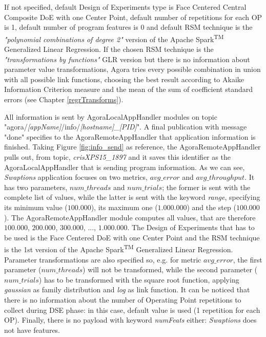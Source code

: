 If not specified, default Design of Experiments type is Face Centered Central Composite DoE with one Center Point, default number of repetitions for each OP is 1, default number of program features is 0 and default RSM technique is the \textit{"polynomial combinations of degree 2"} version of the Apache Spark\textsuperscript{TM} Generalized Linear Regression. If the chosen RSM technique is the \textit{"transformations by functions"} GLR version but there is no information about parameter value transformations, Agora tries every possible combination in union with all possible link functions, choosing the best result according to Akaike Information Criterion measure and the mean of the sum of coefficient standard errors (see Chapter \ref{regrTransforms}).

All information is sent by AgoraLocalAppHandler modules on topic "agora\slash{}\textit{[appName]}\slash{}info\slash{}\textit{[hostname]\_[PID]}". A final publication with message "done" specifies to the AgoraRemoteAppHandler that application information is finished. Taking Figure \ref{fig:info_send} as reference, the AgoraRemoteAppHandler pulls out, from topic, \textit{crisXPS15\_1897} and it saves this identifier as the AgoraLocalAppHandler that is sending program information. As we can see, \textit{Swaptions} application focuses on two metrics, $avg\_error$ and $avg\_throughput$. It has two parameters, $num\_threads$ and $num\_trials$; the former is sent with the complete list of values, while the latter is sent with the keyword \textit{range}, specifying its minimum value ($100.000$), its maximum one ($1.000.000$) and the step ($100.000$). The Agora\-Remote\-App\-Handler module computes all values, that are therefore $100.000$, $200.000$, $300.000$, ..., $1.000.000$. The Design of Experiments that has to be used is the Face Centered DoE with one Center Point and the RSM technique is the 1st version of the Apache Spark\textsuperscript{TM} Generalized Linear Regression. Parameter transformations are also specified so, e.g. for metric $avg\_error$, the first parameter ($num\_threads$) will not be transformed, while the second parameter ($num\_trials$) has to be transformed with the square root function, applying \textit{gaussian} as family distribution and \textit{log} as link function. It can be noticed that there is no information about the number of Operating Point repetitions to collect during DSE phase: in this case, default value is used (1 repetition for each OP). Finally, there is no payload with keyword \textit{numFeats} either: \textit{Swaptions} does not have features.

